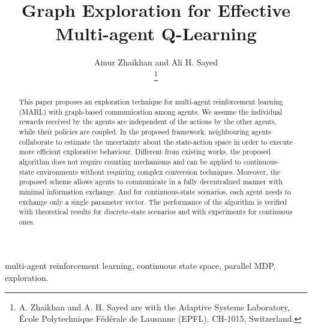 \documentclass[lettersize,journal]{IEEEtran}
\begin{document}
\title{Graph Exploration for Effective Multi-agent Q-Learning}

\author{Ainur Zhaikhan and Ali H. Sayed

\thanks{A. Zhaikhan and A. H. Sayed are with the Adaptive
Systems Laboratory, \'Ecole Polytechnique F\'ed\'erale de Lausanne (EPFL),
CH-1015, Switzerland.}}




\maketitle

\begin{abstract}
This paper proposes an exploration technique for multi-agent reinforcement learning (MARL) with graph-based communication among agents. We assume the individual rewards received by the agents are independent of the actions by the other agents, while their policies are coupled. In the proposed framework, neighbouring agents  collaborate to estimate the uncertainty about the state-action space in order to execute more efficient explorative behaviour. Different from existing works, the proposed algorithm does not require counting mechanisms and can be applied to continuous-state environments without requiring complex conversion techniques. Moreover, the proposed scheme allows agents to communicate in a fully decentralized manner with minimal information exchange. And for continuous-state scenarios, each agent needs to exchange only a single parameter vector. The performance of the algorithm  is verified with theoretical results for discrete-state scenarios and with experiments for continuous ones. 
\end{abstract}

\begin{IEEEkeywords}
multi-agent reinforcement learning,  continuous state space, parallel MDP, exploration.
\end{IEEEkeywords}
\end{document}
